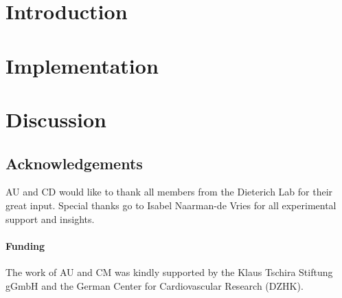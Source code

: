 \documentclass{bioinfo}
\begin{document}
\section*{Introduction}

\section*{Implementation}

\vspace*{-.5cm}
\section*{Discussion}

\subsection*{Acknowledgements}
AU and CD would like to thank all members from the Dieterich Lab for their great input.
Special thanks go to Isabel Naarman-de Vries for all experimental support and insights.
\paragraph{Funding\textcolon} 
The work of AU and CM was kindly supported 
by the Klaus Tschira Stiftung gGmbH and the German Center for Cardiovascular Research (DZHK).
\vspace*{-0.6cm}

%
%
%
%
%
%
%

\end{document}
